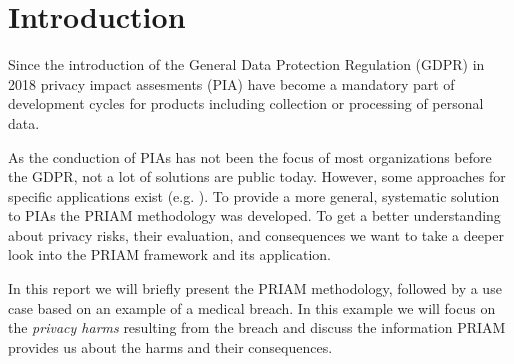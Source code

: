 \section{Introduction}
Since the introduction of the General Data Protection Regulation (GDPR) \cite{gdpr} in 2018 privacy impact assesments (PIA) have become a mandatory part of development cycles for products including collection or processing of personal data.

As the conduction of PIAs has not been the focus of most organizations before the GDPR, not a lot of solutions are public today. However, some approaches for specific applications exist (e.g. \cite{rfid}\cite{smart_grid}). To provide a more general, systematic solution to PIAs the PRIAM methodology \cite{de:hal-01302541} was developed. To get a better understanding about privacy risks, their evaluation, and consequences we want to take a deeper look into the PRIAM framework and its application.

In this report we will briefly present the PRIAM methodology, followed by a use case based on an example of a medical breach. In this example we will focus on the \textit{privacy harms} resulting from the breach and discuss the information PRIAM provides us about the harms and their consequences.  